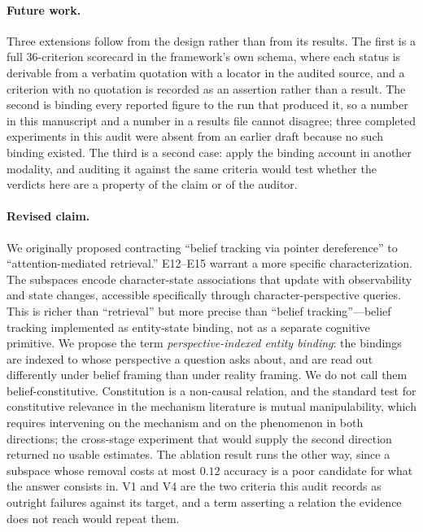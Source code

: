 \documentclass{article}
\begin{document}
\paragraph{Future work.}
Three extensions follow from the design rather than from its results. The first is a full
36-criterion scorecard in the framework's own schema, where each status is derivable from a
verbatim quotation with a locator in the audited source, and a criterion with no quotation is
recorded as an assertion rather than a result. The second is binding every reported figure to
the run that produced it, so a number in this manuscript and a number in a results file
cannot disagree; three completed experiments in this audit were absent from an earlier draft
because no such binding existed. The third is a second case: \citet{cui2026dual} apply the
binding account in another modality, and auditing it against the same criteria would test
whether the verdicts here are a property of the claim or of the auditor.

\paragraph{Revised claim.}
We originally proposed contracting ``belief tracking via pointer dereference'' to ``attention-mediated retrieval.'' E12--E15 warrant a more specific characterization. The subspaces encode character-state associations that update with observability and state changes, accessible specifically through character-perspective queries. This is richer than ``retrieval'' but more precise than ``belief tracking''---belief tracking implemented as entity-state binding, not as a separate cognitive primitive. We propose the term \emph{perspective-indexed entity binding}: the bindings are indexed to
whose perspective a question asks about, and are read out differently under belief framing
than under reality framing. We do not call them belief-constitutive. Constitution is a
non-causal relation, and the standard test for constitutive relevance in the mechanism
literature is mutual manipulability, which requires intervening on the mechanism and on the
phenomenon in both directions; the cross-stage experiment that would supply the second
direction returned no usable estimates. The ablation result runs the other way, since a
subspace whose removal costs at most $0.12$ accuracy is a poor candidate for what the answer
consists in. V1 and V4 are the two criteria this audit records as outright failures against
its target, and a term asserting a relation the evidence does not reach would repeat them.
\end{document}
